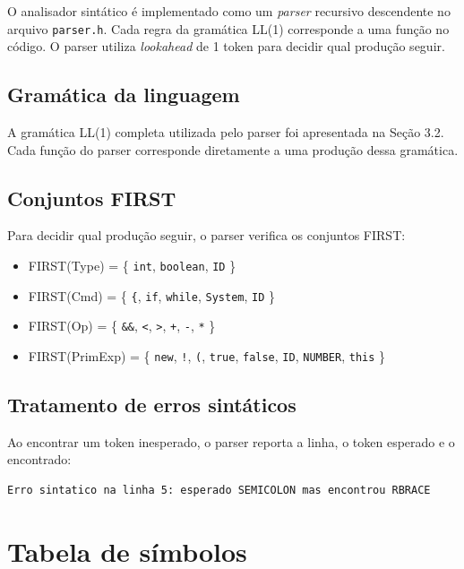\documentclass[a4paper, 12pt]{article}
\begin{document}
O analisador sint\'atico \'e implementado como um \textit{parser} recursivo descendente no arquivo \texttt{parser.h}. Cada regra da gram\'atica LL(1) corresponde a uma fun\c{c}\~ao no c\'odigo. O parser utiliza \textit{lookahead} de 1 token para decidir qual produ\c{c}\~ao seguir.

\subsection{Gram\'atica da linguagem}

A gram\'atica LL(1) completa utilizada pelo parser foi apresentada na Se\c{c}\~ao 3.2. Cada fun\c{c}\~ao do parser corresponde diretamente a uma produ\c{c}\~ao dessa gram\'atica.

\subsection{Conjuntos FIRST}

Para decidir qual produ\c{c}\~ao seguir, o parser verifica os conjuntos FIRST:

\begin{itemize}
    \item FIRST(Type) = \{ \texttt{int}, \texttt{boolean}, \texttt{ID} \}
    \item FIRST(Cmd) = \{ \texttt{\{}, \texttt{if}, \texttt{while}, \texttt{System}, \texttt{ID} \}
    \item FIRST(Op) = \{ \texttt{\&\&}, \texttt{<}, \texttt{>}, \texttt{+}, \texttt{-}, \texttt{*} \}
    \item FIRST(PrimExp) = \{ \texttt{new}, \texttt{!}, \texttt{(}, \texttt{true}, \texttt{false}, \texttt{ID}, \texttt{NUMBER}, \texttt{this} \}
\end{itemize}

\subsection{Tratamento de erros sint\'aticos}

Ao encontrar um token inesperado, o parser reporta a linha, o token esperado e o encontrado:

\begin{lstlisting}[numbers=none]
Erro sintatico na linha 5: esperado SEMICOLON mas encontrou RBRACE
\end{lstlisting}

\section{Tabela de s\'imbolos}
\end{document}
